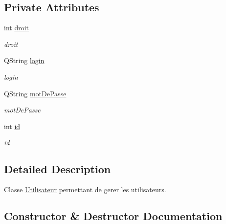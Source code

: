 \subsection*{Private Attributes}
\begin{DoxyCompactItemize}
\item 
\mbox{\label{class_utilisateur_ac4f7dfce4243768a6eabfbb57b883cdf}} 
int \mbox{\hyperlink{class_utilisateur_ac4f7dfce4243768a6eabfbb57b883cdf}{droit}}
\begin{DoxyCompactList}\small\item\em droit \end{DoxyCompactList}\item 
\mbox{\label{class_utilisateur_abb16ed370d845def5c476b79ea415dba}} 
Q\+String \mbox{\hyperlink{class_utilisateur_abb16ed370d845def5c476b79ea415dba}{login}}
\begin{DoxyCompactList}\small\item\em login \end{DoxyCompactList}\item 
\mbox{\label{class_utilisateur_a4f6a17d0fb5c231bcb414396236a056f}} 
Q\+String \mbox{\hyperlink{class_utilisateur_a4f6a17d0fb5c231bcb414396236a056f}{mot\+De\+Passe}}
\begin{DoxyCompactList}\small\item\em mot\+De\+Passe \end{DoxyCompactList}\item 
\mbox{\label{class_utilisateur_a600c54bc097070179b64008dd98bdebb}} 
int \mbox{\hyperlink{class_utilisateur_a600c54bc097070179b64008dd98bdebb}{id}}
\begin{DoxyCompactList}\small\item\em id \end{DoxyCompactList}\end{DoxyCompactItemize}


\subsection{Detailed Description}
Classe \mbox{\hyperlink{class_utilisateur}{Utilisateur}} permettant de gerer les utilisateurs. 

\subsection{Constructor \& Destructor Documentation}
\mbox{\label{class_utilisateur_a9c279c4e14b76e43412e1480f3cfa07e}} 
